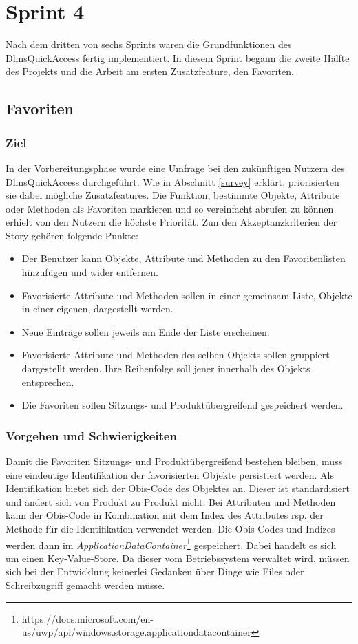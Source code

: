 \section{Sprint 4}\label{sprint4}
Nach dem dritten von sechs Sprints waren die Grundfunktionen des DlmsQuickAccess fertig implementiert.
In diesem Sprint begann die zweite Hälfte des Projekts und die Arbeit am ersten Zusatzfeature, den Favoriten.


\subsection{Favoriten}

\subsubsection{Ziel}
In der Vorbereitungsphase wurde eine Umfrage bei den zukünftigen Nutzern des DlmsQuickAccess durchgeführt.
Wie in Abschnitt \ref{survey} erklärt, priorisierten sie dabei mögliche Zusatzfeatures.
Die Funktion, bestimmte Objekte, Attribute oder Methoden als Favoriten markieren und so vereinfacht abrufen zu können erhielt von den Nutzern die höchste Priorität.
Zun den Akzeptanzkriterien der Story gehören folgende Punkte:
\begin{itemize}
   \item Der Benutzer kann Objekte, Attribute und Methoden zu den Favoritenlisten hinzufügen und wider entfernen.
   \item Favorisierte Attribute und Methoden sollen in einer gemeinsam Liste, Objekte in einer eigenen, dargestellt werden.
   \item Neue Einträge sollen jeweils am Ende der Liste erscheinen.
   \item Favorisierte Attribute und Methoden des selben Objekts sollen gruppiert dargestellt werden. Ihre Reihenfolge soll jener innerhalb des Objekts entsprechen.
   \item Die Favoriten sollen Sitzungs- und Produktübergreifend gespeichert werden.
\end{itemize}


\subsubsection{Vorgehen und Schwierigkeiten}
Damit die Favoriten  Sitzungs- und Produktübergreifend bestehen bleiben, muss eine eindeutige Identifikation der favorisierten Objekte persistiert werden.
Als Identifikation bietet sich der \ac{Obis}-Code des Objektes an.
Dieser ist standardisiert und ändert sich von Produkt zu Produkt nicht.
Bei Attributen und Methoden kann der \ac{Obis}-Code in Kombination mit dem Index des Attributes rsp. der Methode für die Identifikation verwendet werden.
Die \ac{Obis}-Codes und Indizes werden dann im \textit{ApplicationDataContainer}\footnote{https://docs.microsoft.com/en-us/uwp/api/windows.storage.applicationdatacontainer} gespeichert.
Dabei handelt es sich um einen Key-Value-Store.
Da dieser vom Betriebssystem verwaltet wird, müssen sich bei der Entwicklung keinerlei Gedanken über Dinge wie Files oder Schreibzugriff gemacht werden müsse.

